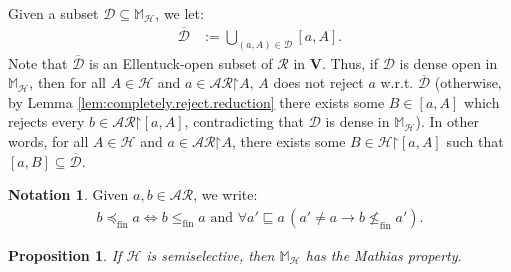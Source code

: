 \documentclass[11pt,reqno]{amsart}
\theoremstyle{plain}
\numberwithin{equation}{section}
\newtheorem{proposition}[theorem]{Proposition}
\theoremstyle{definition}
\newtheorem{notation}[theorem]{Notation}
\renewcommand{\bar}[1]{\overline{#1}}
\newcommand{\cal}{\mathcal}
\renewcommand{\bf}{\mathbf}
\newcommand{\restrictedto}{\mathord{\upharpoonright}}
\newcommand{\V}{\bf{V}}
\renewcommand{\H}{\cal{H}}
\newcommand{\fin}{\mathrm{fin}}
\newcommand{\D}{\cal{D}}
\begin{document}
Given a subset $\D \subseteq \mathbb{M}_\H$, we let:
\begin{align*}
    \bar{\D} &:= \bigcup_{(a,A) \in \D} [a,A].
\end{align*}
Note that $\bar{\D}$ is an Ellentuck-open subset of $\cal{R}$ in $\V$. Thus, if $\D$ is dense open in $\mathbb{M}_\H$, then for all $A \in \H$ and $a \in \cal{AR}\restrictedto A$, $A$ does not reject $a$ w.r.t. $\bar{\D}$ (otherwise, by Lemma \ref{lem:completely.reject.reduction} there exists some $B \in [a,A]$ which rejects every $b \in \cal{AR}\restrictedto[a,A]$, contradicting that $\D$ is dense in $\mathbb{M}_\H$). In other words, for all $A \in \H$ and $a \in \cal{AR}\restrictedto A$, there exists some $B \in \H\restrictedto[a,A]$ such that $[a,B] \subseteq \bar{\D}$.

\begin{notation}
    Given $a,b \in \cal{AR}$, we write:
    \begin{align*}
        b \preceq_\fin a \iff b \leq_\fin a \text{ and } \forall a' \sqsubseteq a \,(a' \neq a \to b \not\leq_\fin a').
    \end{align*}
\end{notation}

\begin{proposition}
\label{prop:semiselective.implies.Mathias}
    If $\H$ is semiselective, then $\mathbb{M}_\H$ has the Mathias property.
\end{proposition}
\end{document}
